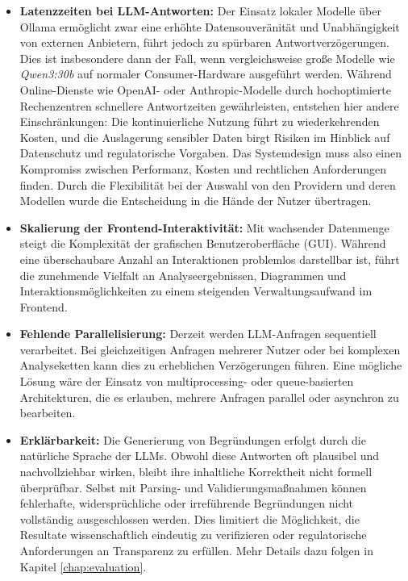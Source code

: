     \begin{itemize}
        \item \textbf{Latenzzeiten bei \acs{LLM}-Antworten:}
        Der Einsatz lokaler Modelle über Ollama ermöglicht zwar eine erhöhte Datensouveränität und Unabhängigkeit von externen Anbietern, führt jedoch zu spürbaren Antwortverzögerungen.
        Dies ist insbesondere dann der Fall, wenn vergleichsweise große Modelle wie \textit{Qwen3:30b} auf normaler Consumer-Hardware ausgeführt werden.
        Während Online-Dienste wie OpenAI- oder Anthropic-Modelle durch hochoptimierte Rechenzentren schnellere Antwortzeiten gewährleisten, entstehen hier andere Einschränkungen:
        Die kontinuierliche Nutzung führt zu wiederkehrenden Kosten, und die Auslagerung sensibler Daten birgt Risiken im Hinblick auf Datenschutz und regulatorische Vorgaben.
        Das Systemdesign muss also einen Kompromiss zwischen Performanz, Kosten und rechtlichen Anforderungen finden.
        Durch die Flexibilität bei der Auswahl von den Providern und deren Modellen wurde die Entscheidung in die Hände der Nutzer übertragen.

        \item \textbf{Skalierung der Frontend-Interaktivität:}
        Mit wachsender Datenmenge steigt die Komplexität der grafischen Benutzeroberfläche (\acs{GUI}).
        Während eine überschaubare Anzahl an Interaktionen problemlos darstellbar ist, führt die zunehmende Vielfalt an Analyseergebnissen, Diagrammen und Interaktionsmöglichkeiten zu einem steigenden Verwaltungsaufwand im Frontend.

        \item \textbf{Fehlende Parallelisierung:}
        Derzeit werden \acs{LLM}-Anfragen sequentiell verarbeitet.
        Bei gleichzeitigen Anfragen mehrerer Nutzer oder bei komplexen Analyseketten kann dies zu erheblichen Verzögerungen führen.
        Eine mögliche Lösung wäre der Einsatz von multiprocessing- oder queue-basierten Architekturen, die es erlauben, mehrere Anfragen parallel oder asynchron zu bearbeiten.

        \item \textbf{Erklärbarkeit:}
        Die Generierung von Begründungen erfolgt durch die natürliche Sprache der \acs{LLM}s.
        Obwohl diese Antworten oft plausibel und nachvollziehbar wirken, bleibt ihre inhaltliche Korrektheit nicht formell überprüfbar.
        Selbst mit Parsing- und Validierungsmaßnahmen können fehlerhafte, widersprüchliche oder irreführende Begründungen nicht vollständig ausgeschlossen werden.
        Dies limitiert die Möglichkeit, die Resultate wissenschaftlich eindeutig zu verifizieren oder regulatorische Anforderungen an Transparenz zu erfüllen.
        Mehr Details dazu folgen in Kapitel \ref{chap:evaluation}.
    \end{itemize}

